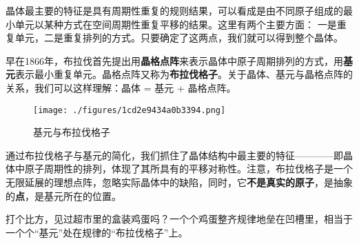 
晶体最主要的特征是具有周期性重复的规则结果，可以看成是由不同原子组成的最小单元以某种方式在空间周期性重复平移的结果。这里有两个主要方面：
一是重复单元，二是重复排列的方式。只要确定了这两点，我们就可以得到整个晶体。

早在1866年，布拉伐首先提出用\textbf{晶格点阵}来表示晶体中原子周期排列的方式，用\textbf{基元}表示最小重复单元。晶格点阵又称为\textbf{布拉伐格子}。关于晶体、基元与晶格点阵的关系，我们可以这样理解：晶体 = 基元 + 晶格点阵。
\begin{figure}[ht]
\centering
\texttt{[image: ./figures/1cd2e9434a0b3394.png]}
\caption{ 基元与布拉伐格子} \label{fig_BraLat_1}
\end{figure}

通过布拉伐格子与基元的简化，我们抓住了晶体结构中最主要的特征————即晶体中原子周期性的排列，体现了其所具有的平移对称性。注意，布拉伐格子是一个无限延展的理想点阵，忽略实际晶体中的缺陷，同时，它\textbf{不是真实的原子}，是抽象的\textbf{点}，是基元所在的位置。

打个比方，见过超市里的盒装鸡蛋吗？一个个鸡蛋整齐规律地垒在凹槽里，相当于一个个“基元”处在规律的“布拉伐格子”上。